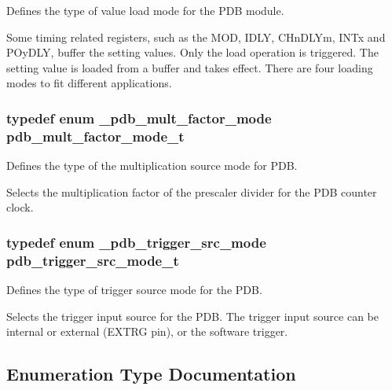 Defines the type of value load mode for the P\+DB module. 

Some timing related registers, such as the M\+OD, I\+D\+LY, C\+Hn\+D\+L\+Ym, I\+N\+Tx and P\+Oy\+D\+LY, buffer the setting values. Only the load operation is triggered. The setting value is loaded from a buffer and takes effect. There are four loading modes to fit different applications. 
\subsubsection[{\texorpdfstring{pdb\+\_\+mult\+\_\+factor\+\_\+mode\+\_\+t}{pdb_mult_factor_mode_t}}]{\setlength{\rightskip}{0pt plus 5cm}typedef enum {\bf \+\_\+pdb\+\_\+mult\+\_\+factor\+\_\+mode}  {\bf pdb\+\_\+mult\+\_\+factor\+\_\+mode\+\_\+t}}\hypertarget{group__pdb__hal_ga26a3aaa96982c57d4db1c4e579dc59db}{}\label{group__pdb__hal_ga26a3aaa96982c57d4db1c4e579dc59db}


Defines the type of the multiplication source mode for P\+DB. 

Selects the multiplication factor of the prescaler divider for the P\+DB counter clock. 
\subsubsection[{\texorpdfstring{pdb\+\_\+trigger\+\_\+src\+\_\+mode\+\_\+t}{pdb_trigger_src_mode_t}}]{\setlength{\rightskip}{0pt plus 5cm}typedef enum {\bf \+\_\+pdb\+\_\+trigger\+\_\+src\+\_\+mode}  {\bf pdb\+\_\+trigger\+\_\+src\+\_\+mode\+\_\+t}}\hypertarget{group__pdb__hal_ga309bd99814bc35b81b79d08340d23258}{}\label{group__pdb__hal_ga309bd99814bc35b81b79d08340d23258}


Defines the type of trigger source mode for the P\+DB. 

Selects the trigger input source for the P\+DB. The trigger input source can be internal or external (E\+X\+T\+RG pin), or the software trigger. 

\subsection{Enumeration Type Documentation}
